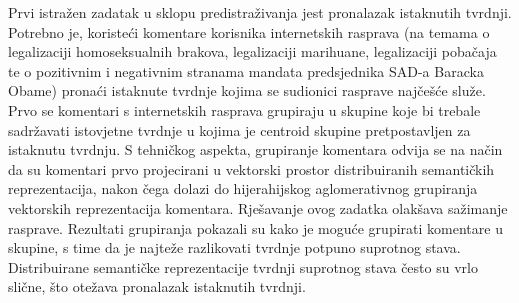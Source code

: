 Prvi istražen zadatak u sklopu predistraživanja jest pronalazak istaknutih
tvrdnji.  Potrebno je, koristeći komentare korisnika internetskih rasprava (na
temama o legalizaciji homoseksualnih brakova, legalizaciji marihuane,
legalizaciji pobačaja te o pozitivnim i negativnim stranama mandata
predsjednika SAD-a Baracka Obame) pronaći istaknute tvrdnje kojima se sudionici
rasprave najčešće služe.  Prvo se komentari s internetskih rasprava grupiraju u
skupine koje bi trebale sadržavati istovjetne tvrdnje u kojima je centroid
skupine pretpostavljen za istaknutu tvrdnju. S tehničkog aspekta, grupiranje
komentara odvija se na način da su komentari prvo projecirani u vektorski
prostor distribuiranih semantičkih reprezentacija, nakon čega dolazi do
hijerahijskog aglomerativnog grupiranja vektorskih reprezentacija komentara.
Rješavanje ovog zadatka olakšava sažimanje rasprave.  Rezultati grupiranja
pokazali su kako je moguće grupirati komentare u skupine, s time da je najteže
razlikovati tvrdnje potpuno suprotnog stava. Distribuirane
semantičke reprezentacije tvrdnji suprotnog stava često su vrlo slične, 
što otežava pronalazak istaknutih tvrdnji.

